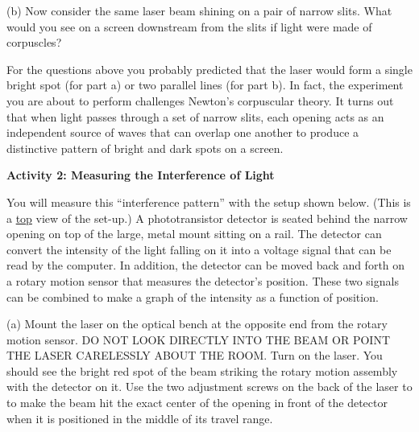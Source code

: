 (b) Now consider the same laser beam shining on a pair of narrow slits.
What would you see on a screen downstream from the slits if light
were made of corpuscles?
\answerspace{35mm}

\pagebreak[2]
For the questions above you probably predicted that the laser would
form a single bright spot (for part a) or two parallel lines (for part
b).  In fact, the experiment you are about to perform challenges Newton's corpuscular theory. 
It turns out that when light passes through a set of narrow slits, each opening acts as an independent
source of waves that can overlap one another to produce a distinctive
pattern of bright and dark spots on a screen. 

\textbf{Activity 2: Measuring the Interference of Light }

You will measure this ``interference pattern'' with the setup shown below. 
(This is a \underline{top} view of the set-up.) 
A phototransistor detector is seated behind the narrow opening on top of the large,
metal mount sitting on a rail. The detector can convert the intensity 
of the light falling on it into a voltage signal that can be read by the
computer. In addition, the detector can be moved back and
forth on a rotary motion sensor that measures the detector's position. These two signals can be combined to
make a graph of the intensity as a function of position.

\answerspace{0.3cm}
{\centering {} \par}
\answerspace{0.3cm}

(a) Mount the laser on the 
optical bench at the opposite end from the rotary motion sensor.
DO NOT LOOK DIRECTLY INTO
THE BEAM OR POINT THE LASER CARELESSLY ABOUT THE ROOM.  Turn on the
laser.  You should see the bright red spot of the beam striking
the rotary motion assembly with the detector on it. 
Use the two adjustment screws on the back of the laser to to make the beam hit the exact center of the opening in front of the detector when it is positioned in the middle of its travel range.  

